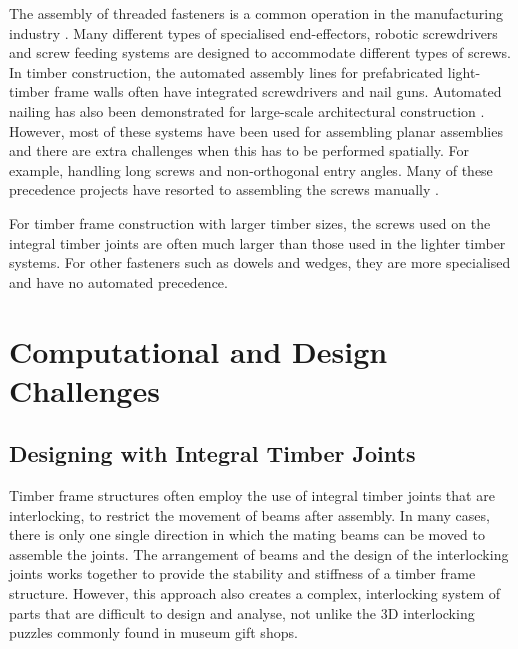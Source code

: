The assembly of threaded fasteners is a common operation in the manufacturing industry \parencite{jiaSurveyAutomatedThreaded2019}. Many different types of specialised end-effectors, robotic screwdrivers and screw feeding systems are designed to accommodate different types of screws. In timber construction, the automated assembly lines for prefabricated light-timber frame walls often have integrated screwdrivers and nail guns. Automated nailing has also been demonstrated for large-scale architectural construction \parencite{apolinarskaComplexTimberStructures2018, apolinarskaSequentialRoof2016}. However, most of these systems have been used for assembling planar assemblies and there are extra challenges when this has to be performed spatially. For example, handling long screws and non-orthogonal entry angles. Many of these precedence projects have resorted to assembling the screws manually \parencite{apolinarskaRoboticAssemblyTimber2021, thomaRoboticFabricationBespoke2018, willmannNewParadigmsAutomatic2016}. 

For timber frame construction with larger timber sizes, the screws used on the integral timber joints are often much larger than those used in the lighter timber systems. For other fasteners such as dowels and wedges, they are more specialised and have no automated precedence. 

\section{Computational and Design Challenges}
\label{section:challenges-computational-and-design-challenges}

\subsection{Designing with Integral Timber Joints}
\label{subsection:challenges-designing-with-integral-timber-joints}

Timber frame structures often employ the use of integral timber joints that are interlocking, to restrict the movement of beams after assembly. In many cases, there is only one single direction in which the mating beams can be moved to assemble the joints. The arrangement of beams and the design of the interlocking joints works together to provide the stability and stiffness of a timber frame structure. However, this approach also creates a complex, interlocking system of parts that are difficult to design and analyse, not unlike the 3D interlocking puzzles commonly found in museum gift shops.

